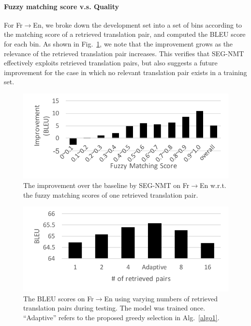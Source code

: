 \paragraph{Fuzzy matching score v.s. Quality}
For Fr$\to$En, we broke down the development set into a set of bins according to the matching score of a retrieved translation pair, and computed the BLEU score for each bin. As shown in Fig.~\ref{fig:fuzzy_improv}, we note that the improvement grows as the relevance of the retrieved translation pair increases. This verifies that SEG-NMT effectively exploits retrieved translation pairs, but also suggests a future improvement for the case in which no relevant translation pair exists in a training set. 
\begin{figure}
\centering
\includegraphics[width=\linewidth,clip=True,trim=0 15 0 30]{figs/seg/fuzzy_improv.pdf}
\vspace{-3mm}
\caption{
\label{fig:fuzzy_improv}
The improvement over the baseline by SEG-NMT on Fr$\to$En w.r.t. the fuzzy matching scores of one retrieved translation pair. 
}
\vspace{-4mm}
\end{figure}
\begin{figure}
\centering
\includegraphics[width=\linewidth,clip=True,trim=0 5 0 20]{figs/seg/bleu_retrieved.pdf}
\vspace{-6mm}
\caption{
\label{fig:bleu_retrieved}
The BLEU scores on Fr$\to$En using varying numbers of retrieved translation pairs during testing. The model was trained once. ``Adaptive'' refers to the proposed greedy selection in Alg.~\ref{algo1}.
}
\vspace{-4mm}
\end{figure}

